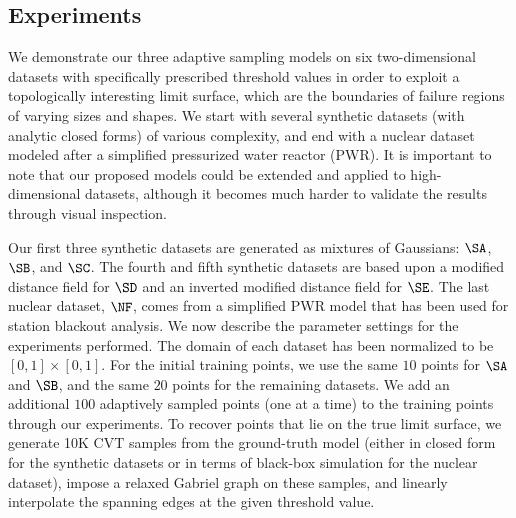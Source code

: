 %

\subsection{Experiments}
\label{sec:experiments}
We demonstrate our three adaptive sampling models on six two-dimensional datasets with specifically prescribed threshold values in order to exploit a topologically interesting limit surface, which are the boundaries of failure regions of varying sizes and shapes.
%
We start with several synthetic datasets (with analytic closed forms) of various complexity, and end with a nuclear dataset modeled after a simplified pressurized water reactor (PWR).
%
It is important to note that our proposed models could be extended and applied to high-dimensional datasets, although it becomes much harder to validate the results through visual inspection.

Our first three synthetic datasets are generated as mixtures of Gaussians: $\SA$, $\SB$, and $\SC$.
%
The fourth and fifth synthetic datasets are based upon a modified distance field for $\SD$ and an inverted modified distance field for $\SE$.
%
The last nuclear dataset, $\NF$, comes from a simplified PWR model that has been used for station blackout analysis.
%
We now describe the parameter settings for the experiments performed.
%
The domain of each dataset has been normalized to be $[0,1] \times [0,1]$.
%
For the initial training points, we use the same $10$ points for $\SA$ and $\SB$, and the same $20$ points for the remaining datasets.
%
We add an additional $100$ adaptively sampled points (one at a time) to the training points through our experiments.
%
To recover points that lie on the true limit surface, we generate 10K CVT samples from the ground-truth model (either in closed form for the synthetic datasets or in terms of black-box simulation for the nuclear dataset), impose a relaxed Gabriel graph on these samples, and linearly interpolate the spanning edges at the given threshold value.

